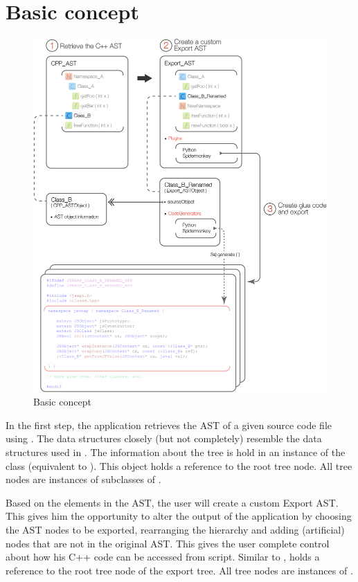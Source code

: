 \newpage
\section{Basic concept}
\label{sec:BasicConcept}

\begin{figure}[h] %
	\centering
		\includegraphics[scale=0.35]{Images/GUIApp_Concept.jpg}
	\caption{Basic concept}
	\label{fig:GUIAppConcept}
\end{figure}

In the first step, the application retrieves the  AST of a given source code file using . The data structures closely (but not completely) resemble the data structures used in . The information about the tree is hold in an instance of the  class  (equivalent to ). This object holds a reference to the root tree node. All tree nodes are instances of subclasses of .

Based on the elements in the  AST, the user will create a custom Export AST. This gives him the opportunity to alter the output of the application by choosing the AST nodes to be exported, rearranging the hierarchy and adding (artificial) nodes that are not in the original  AST. This gives the user complete control about how his C++ code can be accessed from script. Similar to ,  holds a reference to the root tree node of the export tree. All tree nodes are instances of .

